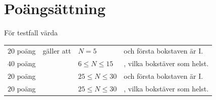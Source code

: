 \section*{Poängsättning}

För testfall värda 
\begin{tabular}{llll}
$20$ poäng & gäller att &$N=5$ & och första bokstaven är I. \\
$40$ poäng &  & $6\le N\le 15$ &, vilka bokstäver som helst.\\
$20$ poäng &  & $25\le N\le 30$ & och första bokstaven är I. \\
$20$ poäng &  & $25\le N\le 30$ &, vilka bokstäver som helst. \\
\end{tabular}                          
